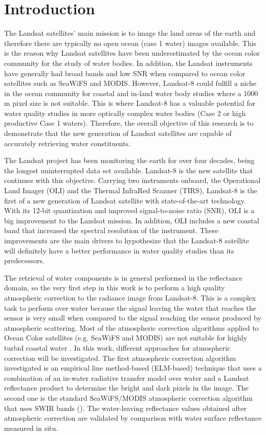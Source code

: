 \chapter{Introduction}
\label{ch:introduction} 
The Landsat satellites' main mission is to image the land areas of the earth and therefore there are typically no open ocean (case 1 water) images available. This is the reason why Landsat satellites have been underestimated by the ocean color community for the study of water bodies. In addition, the Landsat instruments have generally had broad bands and low SNR when compared to ocean color satellites such as SeaWiFS and MODIS. However, Landsat-8 could fulfill a niche in the ocean community for coastal and in-land water  body studies where a 1000 m pixel size is not suitable. This is where Landsat-8 has a valuable potential for water quality studies in more optically complex water bodies (Case 2 or high productive Case 1 waters). Therefore, the overall objective of this research is to demonstrate that the new generation of Landsat satellites are capable of accurately retrieving water constituents.

The Landsat project has been monitoring the earth for over four decades, being the longest uninterrupted data set available. Landsat-8 is the new satellite that continues with this objective. Carrying two instruments onboard, the Operational Land Imager (OLI) and the Thermal InfraRed Scanner (TIRS), Landsat-8 is the first of a new generation of Landsat satellite with state-of-the-art technology. With its 12-bit quantization and improved signal-to-noise ratio (SNR), OLI is a big improvement to the Landsat mission. In addition, OLI includes a new coastal band that increased the spectral resolution of the instrument. These improvements are the main drivers to hypothesize that the Landsat-8 satellite will definitely have a better performance in water quality studies than its predecessors. 

The retrieval of water components is in general performed in the reflectance domain, so the very first step in this work is to perform a high quality atmospheric correction to the radiance image from Landsat-8. This is a complex task to perform over water because the signal leaving the water that reaches the sensor is very small when compared to the signal reaching the sensor produced by atmospheric scattering. Most of the atmospheric correction algorithms applied to Ocean Color satellites (e.g. SeaWiFS and MODIS) are not suitable for highly turbid coastal water \cite{Patt2003}. In this work, different approaches for atmospheric correction will be investigated. The first atmospheric correction algorithm investigated is an empirical line method-based (ELM-based) technique that uses a combination of an in-water radiative transfer model over water and a Landsat reflectance product to determine the bright and dark pixels in the image. The second one is the standard SeaWiFS/MODIS atmospheric correction algorithm that uses SWIR bands (\cite{Wang:2007}). The water-leaving reflectance values obtained after atmospheric correction are validated by comparison with water surface reflectance measured in situ. 

